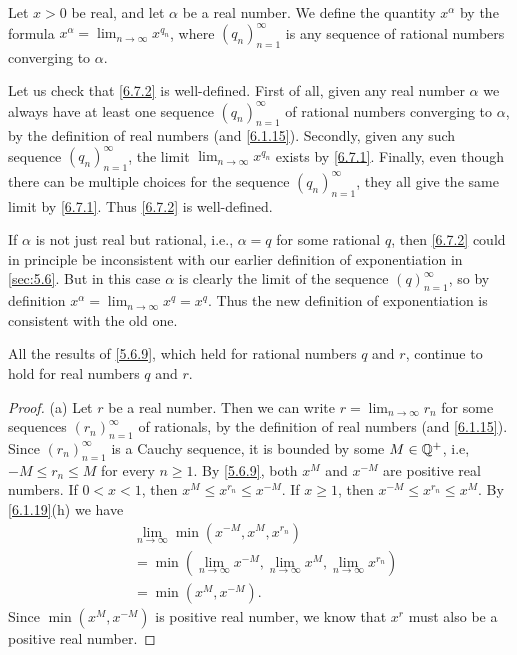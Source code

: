 \begin{defn}\label{6.7.2}
  Let \(x > 0\) be real, and let \(\alpha\) be a real number.
  We define the quantity \(x^\alpha\) by the formula \(x^\alpha = \lim_{n \to \infty} x^{q_n}\), where \((q_n)_{n = 1}^\infty\) is any sequence of rational numbers converging to \(\alpha\).
\end{defn}

\begin{note}
  Let us check that \cref{6.7.2} is well-defined.
  First of all, given any real number \(\alpha\) we always have at least one sequence \((q_n)_{n = 1}^\infty\) of rational numbers converging to \(\alpha\), by the definition of real numbers (and \cref{6.1.15}).
  Secondly, given any such sequence \((q_n)_{n = 1}^\infty\), the limit \(\lim_{n \to \infty} x^{q_n}\) exists by \cref{6.7.1}.
  Finally, even though there can be multiple choices for the sequence \((q_n)_{n = 1}^\infty\), they all give the same limit by \cref{6.7.1}.
  Thus \cref{6.7.2} is well-defined.
\end{note}

\begin{note}
  If \(\alpha\) is not just real but rational, i.e., \(\alpha = q\) for some rational \(q\), then \cref{6.7.2} could in principle be inconsistent with our earlier definition of exponentiation in \cref{sec:5.6}.
  But in this case \(\alpha\) is clearly the limit of the sequence \((q)_{n = 1}^\infty\), so by definition \(x^\alpha = \lim_{n \to \infty} x^q = x^q\).
  Thus the new definition of exponentiation is consistent with the old one.
\end{note}

\begin{prop}\label{6.7.3}
  All the results of \cref{5.6.9}, which held for rational numbers \(q\) and \(r\), continue to hold for real numbers \(q\) and \(r\).
\end{prop}

\begin{proof}{(a)}
  Let \(r\) be a real number.
  Then we can write \(r = \lim_{n \to \infty} r_n\) for some sequences \((r_n)_{n = 1}^\infty\) of rationals, by the definition of real numbers (and \cref{6.1.15}).
  Since \((r_n)_{n = 1}^\infty\) is a Cauchy sequence, it is bounded by some \(M \in \mathbb{Q}^+\), i.e, \(-M \leq r_n \leq M\) for every \(n \geq 1\).
  By \cref{5.6.9}, both \(x^M\) and \(x^{-M}\) are positive real numbers.
  If \(0 < x < 1\), then \(x^M \leq x^{r_n} \leq x^{-M}\).
  If \(x \geq 1\), then \(x^{-M} \leq x^{r_n} \leq x^M\).
  By \cref{6.1.19}(h) we have
  \begin{align*}
     & \lim_{n \to \infty} \min(x^{-M}, x^M, x^{r_n})                                           \\
     & = \min(\lim_{n \to \infty} x^{-M}, \lim_{n \to \infty} x^M, \lim_{n \to \infty} x^{r_n}) \\
     & = \min(x^M, x^{-M}).
  \end{align*}
  Since \(\min(x^M, x^{-M})\) is positive real number, we know that \(x^r\) must also be a positive real number.
\end{proof}

